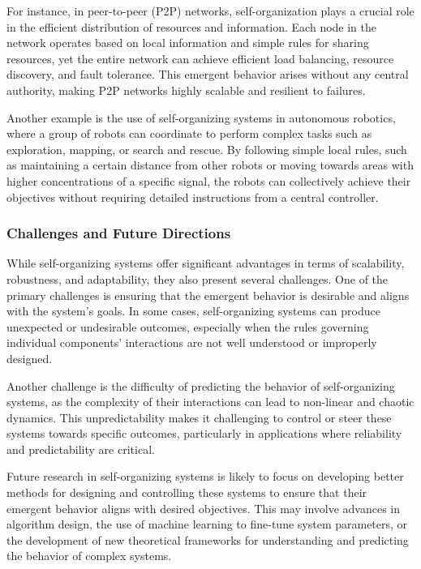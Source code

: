 \documentclass[12pt,twoside]{article}
\begin{document}
For instance, in peer-to-peer (P2P) networks, self-organization plays a crucial role in the efficient distribution of resources and information. Each node in the network operates based on local information and simple rules for sharing resources, yet the entire network can achieve efficient load balancing, resource discovery, and fault tolerance. This emergent behavior arises without any central authority, making P2P networks highly scalable and resilient to failures.

Another example is the use of self-organizing systems in autonomous robotics, where a group of robots can coordinate to perform complex tasks such as exploration, mapping, or search and rescue. By following simple local rules, such as maintaining a certain distance from other robots or moving towards areas with higher concentrations of a specific signal, the robots can collectively achieve their objectives without requiring detailed instructions from a central controller.

\subsubsection{Challenges and Future Directions}


While self-organizing systems offer significant advantages in terms of scalability, robustness, and adaptability, they also present several challenges. One of the primary challenges is ensuring that the emergent behavior is desirable and aligns with the system's goals. In some cases, self-organizing systems can produce unexpected or undesirable outcomes, especially when the rules governing individual components' interactions are not well understood or improperly designed.

Another challenge is the difficulty of predicting the behavior of self-organizing systems, as the complexity of their interactions can lead to non-linear and chaotic dynamics. This unpredictability makes it challenging to control or steer these systems towards specific outcomes, particularly in applications where reliability and predictability are critical.

Future research in self-organizing systems is likely to focus on developing better methods for designing and controlling these systems to ensure that their emergent behavior aligns with desired objectives. This may involve advances in algorithm design, the use of machine learning to fine-tune system parameters, or the development of new theoretical frameworks for understanding and predicting the behavior of complex systems.
\end{document}
